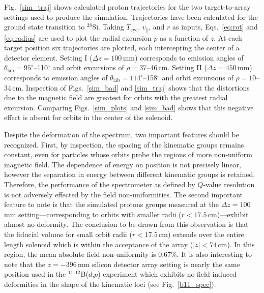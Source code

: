 Fig.~\ref{sim_traj} shows calculated proton trajectories for the two target-to-array settings used to produce the simulation.  Trajectories have been calculated for the ground state transition to $^{28}$Si.  Taking $T_\mathrm{cyc}$, $v_\parallel$, and $r$ as inputs, Eqs.~\ref{eq:rot} and \ref{eq:radius} are used to plot the radial excursion $p$ as a function of $z$.  At each target position six trajectories are plotted, each intercepting the center of a detector element.  
Setting I ($\Delta z=100$\,mm) corresponds to emission angles of  $\theta_\mathrm{lab}=95^\circ$--110$^\circ$ and orbit excursions of $\rho=37$--46\,cm.  Setting II ($\Delta z=450$\,mm) corresponds to emission angles of  $\theta_\mathrm{lab}=114^\circ$--158$^\circ$ and orbit excursions of $\rho=10$--34\,cm.  Inspection of Figs.~\ref{sim_bad} and \ref{sim_traj} shows that the distortions due to the magnetic field are greatest for orbits with the greatest radial excursion.  Comparing Figs.~\ref{sim_plots} and \ref{sim_bad} shows that this negative effect is absent for orbits in the center of the solenoid.

Despite the deformation of the spectrum, two important features should be recognized.  First, by inspection, the spacing of the kinematic groups remains constant, even for particles whose orbits probe the regions of more non-uniform magnetic field.  The dependence of energy on position is not precisely linear, however the separation in energy between different kinematic groups is retained.  Therefore, the performance of the spectrometer as defined by $Q$-value resolution is not adversely effected by the field non-uniformities.  The second important feature to note is that the simulated protons groups measured at the $\Delta z=100$\,mm setting---corresponding to orbits with smaller radii ($r<17.5$\,cm)---exhibit almost no deformity.  The conclusion to be drawn from this observation is that the fiducial volume for small orbit radii ($r<17.5$\,cm) extends over the entire length solenoid which is within the acceptance of the array ($|z|<74$\,cm).  In this region, the mean absolute field non-uniformity is 0.67\%.  It is also interesting to note that the $z=-396$\,mm silicon detector array setting is nearly the same  position used in the $^{11,12}$B($d$,$p$) experiment which exhibits no field-induced deformities in the shape of the kinematic loci (see Fig.~\ref{b11_spec}).
 
